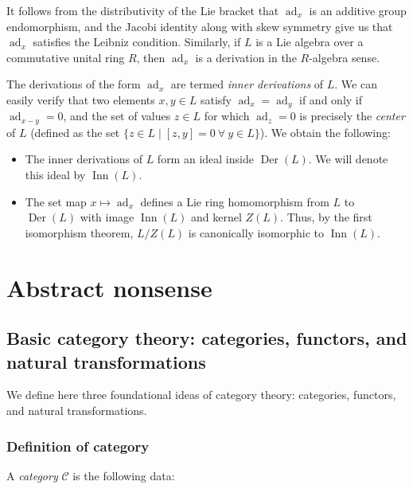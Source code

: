 It follows from the distributivity of the Lie bracket that $\operatorname{ad}_x$ is
an additive group endomorphism, and the Jacobi identity along with
skew symmetry give us that $\operatorname{ad}_x$ satisfies the Leibniz
condition. Similarly, if $L$ is a Lie algebra over a commutative
unital ring $R$, then $\operatorname{ad}_x$ is a derivation in the $R$-algebra
sense.

The derivations of the form $\operatorname{ad}_x$ are termed {\em inner derivations}
of $L$. We can easily verify that two elements $x,y \in L$ satisfy
$\operatorname{ad}_x = \operatorname{ad}_y$ if and only if $\operatorname{ad}_{x-y} = 0$, and the set of values
$z \in L$ for which $\operatorname{ad}_z = 0$ is precisely the {\em center} of $L$
(defined as the set $ \{ z \in L \mid [z,y] = 0 \ \forall \ y \in L
\}$). We obtain the following:

\begin{itemize}
\item The inner derivations of $L$ form an ideal inside
  $\operatorname{Der}(L)$. We will denote this ideal by
  $\operatorname{Inn}(L)$.
\item The set map $x \mapsto \operatorname{ad}_x$ defines a Lie ring homomorphism
  from $L$ to $\operatorname{Der}(L)$ with image
  $\operatorname{Inn}(L)$ and kernel $Z(L)$. Thus, by the first
  isomorphism theorem, $L/Z(L)$ is canonically isomorphic to
  $\operatorname{Inn}(L)$.
\end{itemize}


\section{Abstract nonsense}\label{appsec:abstract-nonsense}

\subsection{Basic category theory: categories, functors, and natural transformations}\label{appsec:category}

We define here three foundational ideas of category theory:
categories, functors, and natural transformations.

\subsubsection{Definition of category}

A {\em category} $\mathcal{C}$ is the following data:


